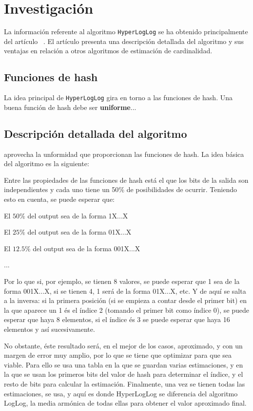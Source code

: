 % 
\section{Investigación}

La información referente al algoritmo \texttt{HyperLogLog} se ha obtenido principalmente
del artículo  ~\cite{hll:HyperLogLog}.
El artículo presenta una descripción detallada del algoritmo y sus ventajas en relación a otros
algoritmos de estimación de cardinalidad.

\subsection{Funciones de hash}

La idea principal de \texttt{HyperLogLog} gira en torno a las funciones de hash.
Una buena función de hash debe ser \textbf{uniforme}...

\subsection{Descripción detallada del algoritmo}
aprovecha la unformidad que proporcionan las funciones de hash. La idea básica del algoritmo es la
siguiente:

Entre las propiedades de las funciones de hash está el que los bits de la salida son independientes
y cada uno tiene un 50$\%$ de posibilidades de ocurrir. Teniendo esto en cuenta, se puede esperar
que:

	El $50\%$ del output sea de la forma 1X...X
	
	El $25\%$ del output sea de la forma 01X...X
	
	El $12.5\%$ del output sea de la forma 001X...X
	
	...
	
Por lo que si, por ejemplo, se tienen 8 valores, se puede esperar que 1 sea de la forma 001X...X,
si se tienen 4, 1 será de la forma 01X...X, etc. Y de aquí se salta a la inversa: si la primera
posición (si se empieza a contar desde el primer bit) en la que aparece un 1 és el índice 2 (tomando
el primer bit como índice 0), se puede esperar que haya 8 elementos, si el índice és 3 se puede
esperar que haya 16 elementos y así sucesivamente.

No obstante, éste resultado será, en el mejor de los casos, aproximado, y con un margen de error
muy amplio, por lo que se tiene que optimizar para que sea viable. Para ello se usa una tabla en la
que se guardan varias estimaciones, y en la que se usan los primeros bits del valor de hash para
determinar el índice, y el resto de bits para calcular la estimación. Finalmente, una vez se tienen
todas las estimaciones, se usa, y aquí es donde HyperLogLog se diferencia del algoritmo LogLog,
la media armónica de todas ellas para obtener el valor aproximado final.


